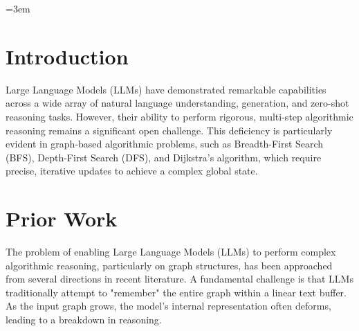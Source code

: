 \documentclass[sigplan,screen]{acmart}
\begin{document}



\sloppy
\raggedbottom
\emergencystretch=3em
\vfuzz=10000pt
\hfuzz=10000pt
\vfuzz=10000pt
\hfuzz=10000pt

\maketitle

\section{Introduction}
Large Language Models (LLMs) have demonstrated remarkable capabilities across a wide array of natural language understanding, generation, and zero-shot reasoning tasks. However, their ability to perform rigorous, multi-step algorithmic reasoning remains a significant open challenge. This deficiency is particularly evident in graph-based algorithmic problems, such as Breadth-First Search (BFS), Depth-First Search (DFS), and Dijkstra’s algorithm, which require precise, iterative updates to achieve a complex global state.

\section{Prior Work}
The problem of enabling Large Language Models (LLMs) to perform complex algorithmic reasoning, particularly on graph structures, has been approached from several directions in recent literature. A fundamental challenge is that LLMs traditionally attempt to "remember" the entire graph within a linear text buffer. As the input graph grows, the model's internal representation often deforms, leading to a breakdown in reasoning.
\end{document}
